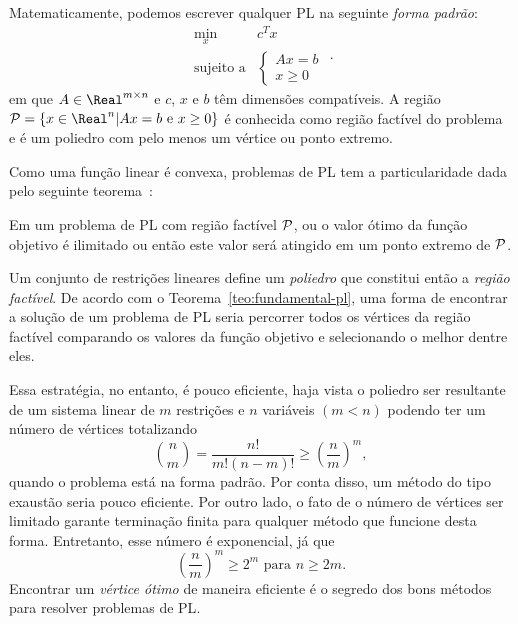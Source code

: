     
Matematicamente, podemos escrever qualquer \ac{PL} na seguinte \emph{forma
padrão}:
\begin{equation} \label{eq:introPL-primal}
	\begin{array}{lc}
\displaystyle \min_{x} & c^Tx \\
\text{sujeito a} &\begin{cases} Ax = b \\
				 x \geq 0	
				 \end{cases}
\end{array}.
\end{equation}
em que $A\in \Real^{m\times n}$ e $c$, $x$ e $b$ têm dimensões compatíveis. A
região $\Pset = \{x\in\Real^n | Ax=b \text{ e } x\geq 0\}$ é conhecida como
região factível do problema e é um poliedro com pelo menos um vértice ou
ponto extremo.

Como uma função linear é convexa, problemas de \ac{PL} tem a particularidade
dada pelo seguinte
teorema~\cite[cap.~3]{Bazaraa:2009uu}:

\begin{teo} \label{teo:fundamental-pl} Em um
problema de \acl{PL} com região factível $\mathcal{P}$, ou o valor ótimo da função objetivo é  ilimitado ou então este valor
será atingido em um ponto extremo de  $\mathcal{P}$.
\end{teo}


Um conjunto de restrições lineares define um \emph{poliedro} que constitui
então a \emph{região factível}. De acordo com o
Teorema~\ref{teo:fundamental-pl}, uma forma de encontrar a solução de um
problema de \ac{PL} seria percorrer todos os vértices da região factível
comparando os valores da função objetivo e selecionando o melhor dentre eles.

Essa estratégia, no entanto, é pouco eficiente, haja vista o poliedro ser
resultante de um sistema linear de	$m$ restrições e $n$  variáveis $(m<n)$
podendo ter um número de vértices totalizando
\[ 
\binom{n}{m} = \dfrac{n!}{m!(n-m)!} \geq 
\left(\dfrac{n}{m}\right)^m,
\]
quando o problema está na forma padrão. Por conta disso, um método do tipo
exaustão seria pouco eficiente. Por outro lado, o fato de o número de vértices
ser limitado garante terminação finita para qualquer método que funcione desta
forma. Entretanto, esse número é exponencial,
já que 
\[
\left(\dfrac{n}{m}\right)^m \geq 2^m  \text{ para }   n\geq 2m.
\]
Encontrar um \emph{vértice ótimo} de maneira  eficiente é o
segredo dos bons métodos para resolver problemas de \ac{PL}.

